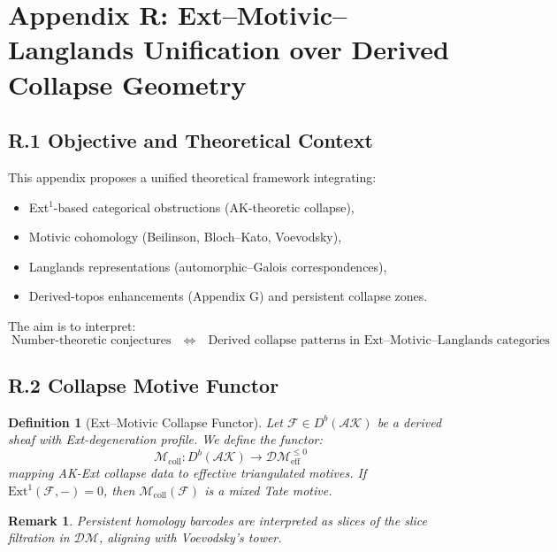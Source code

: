 \documentclass[11pt]{article}
\newtheorem{definition}[theorem]{Definition}
\newtheorem{remark}[theorem]{Remark}
\begin{document}

\section*{Appendix R: Ext–Motivic–Langlands Unification over Derived Collapse Geometry}

\subsection*{R.1 Objective and Theoretical Context}

This appendix proposes a unified theoretical framework integrating:

\begin{itemize}
  \item Ext$^1$-based categorical obstructions (AK-theoretic collapse),
  \item Motivic cohomology (Beilinson, Bloch–Kato, Voevodsky),
  \item Langlands representations (automorphic–Galois correspondences),
  \item Derived-topos enhancements (Appendix G) and persistent collapse zones.
\end{itemize}

The aim is to interpret:
\[
\boxed{
  \text{Number-theoretic conjectures} \quad \Longleftrightarrow \quad
  \text{Derived collapse patterns in Ext–Motivic–Langlands categories}
}
\]

\subsection*{R.2 Collapse Motive Functor}

\begin{definition}[Ext–Motivic Collapse Functor]
Let \( \mathcal{F} \in D^b(\mathcal{AK}) \) be a derived sheaf with Ext-degeneration profile.  
We define the functor:
\[
\mathcal{M}_{\mathrm{coll}} : D^b(\mathcal{AK}) \to \mathcal{DM}_{\mathrm{eff}}^{\leq 0}
\]
mapping AK-Ext collapse data to effective triangulated motives.  
If \( \mathrm{Ext}^1(\mathcal{F}, -) = 0 \), then \( \mathcal{M}_{\mathrm{coll}}(\mathcal{F}) \) is a mixed Tate motive.
\end{definition}

\begin{remark}
Persistent homology barcodes are interpreted as slices of the slice filtration in \( \mathcal{DM} \), aligning with Voevodsky’s tower.
\end{remark}
\end{document}
